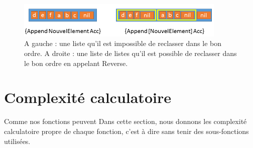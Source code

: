 \documentclass[10pt,a4paper]{article}
\begin{document}
\begin{figure}[h!]
	\centering
	\includegraphics[width=10cm]{images/AstuceAppend.png}
	\caption{A gauche : une liste qu'il est impossible de reclasser dans le bon ordre. 
	A droite : une liste de listes qu'il est possible de reclasser dans le bon ordre en appelant Reverse.}
	\label{fig:astuceReverse}
\end{figure}

\section{Complexité calculatoire}
Comme nos fonctions peuvent Dans cette section, nous donnons les complexité calculatoire
propre de chaque fonction, c'est à dire sans tenir des sous-fonctions
utilisées.
\end{document}
